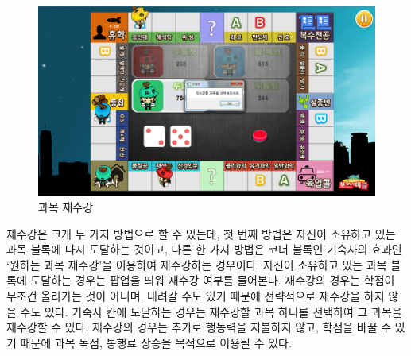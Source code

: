\documentclass[10pt,oneside,a4paper,titlepage]{article}
\begin{document}
\begin{figure}[H]
\centering
\centerline{\includegraphics[scale=0.65]{images/7retake}}
\caption{과목 재수강}
\end{figure}

재수강은 크게 두 가지 방법으로 할 수 있는데, 첫 번째 방법은 자신이 소유하고 있는 과목 블록에 다시 도달하는 것이고, 다른 한 가지 방법은 코너 블록인 기숙사의 효과인 ‘원하는 과목 재수강’을 이용하여 재수강하는 경우이다. 자신이 소유하고 있는 과목 블록에 도달하는 경우는 팝업을 띄워 재수강 여부를 물어본다. 재수강의 경우는 학점이 무조건 올라가는 것이 아니며, 내려갈 수도 있기 때문에 전략적으로 재수강을 하지 않을 수도 있다. 기숙사 칸에 도달하는 경우는 재수강할 과목 하나를 선택하여 그 과목을 재수강할 수 있다. 재수강의 경우는 추가로 행동력을 지불하지 않고, 학점을 바꿀 수 있기 때문에 과목 독점, 통행료 상승을 목적으로 이용될 수 있다.
 
\end{document}
